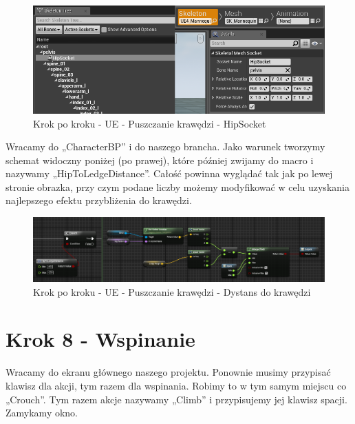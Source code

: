 \documentclass[12pt]{xmgr}
\begin{document}
\begin{figure}[!htb]
    \begin{center}
    \includegraphics[scale=0.5]{Screeny/UeKrokPoKroku/HipSocket}
    \end{center}
    \caption{Krok po kroku - UE - Puszczanie krawędzi - HipSocket}
\end{figure}

Wracamy do „CharacterBP” i do naszego brancha. Jako warunek tworzymy schemat widoczny poniżej (po prawej), które później zwijamy do macro i nazywamy „HipToLedgeDistance”. Całość powinna wyglądać tak jak po lewej stronie obrazka, przy czym podane liczby możemy modyfikować w celu uzyskania najlepszego efektu przybliżenia do krawędzi.

\begin{figure}[!htb]
    \begin{center}
    \includegraphics[scale=0.5]{Screeny/UeKrokPoKroku/HipToLedgeDistanceMacro}
    \end{center}
    \caption{Krok po kroku - UE - Puszczanie krawędzi - Dystans do krawędzi}
\end{figure}

\newpage
\section{Krok 8 - Wspinanie}

Wracamy do ekranu głównego naszego projektu. Ponownie musimy przypisać klawisz dla akcji, tym razem dla wspinania. Robimy to w tym samym miejscu co „Crouch”. Tym razem akcje nazywamy „Climb” i przypisujemy jej klawisz spacji. Zamykamy okno.
\end{document}
